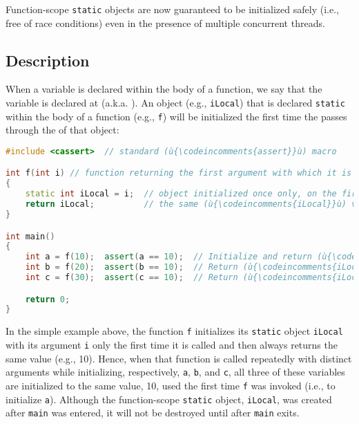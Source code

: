 

Function-scope \lstinline!static! objects are now guaranteed to be
initialized safely (i.e., free of race conditions) even in the presence
of multiple concurrent threads.

\subsection[Description]{Description}\label{description-functionstatic}

When a variable is declared within the body of a function, we say that
the variable is declared at  (a.k.a.
). An object (e.g., \lstinline!iLocal!) that is
declared \lstinline!static! within the body of a function (e.g.,
\lstinline!f!) will be initialized the first time the  passes through the  of that object:

\begin{lstlisting}[language=C++]
#include <cassert>  // standard (ù{\codeincomments{assert}}ù) macro

int f(int i) // function returning the first argument with which it is called
{
    static int iLocal = i;  // object initialized once only, on the first call
    return iLocal;          // the same (ù{\codeincomments{iLocal}}ù) value is returned on every call
}

int main()
{
    int a = f(10);  assert(a == 10);  // Initialize and return (ù{\codeincomments{iLocal}}ù).
    int b = f(20);  assert(b == 10);  // Return (ù{\codeincomments{iLocal}}ù).
    int c = f(30);  assert(c == 10);  // Return (ù{\codeincomments{iLocal}}ù).

    return 0;
}
\end{lstlisting}
    
\noindent In the simple example above, the function \lstinline!f! initializes its
\lstinline!static! object \lstinline!iLocal! with its argument \lstinline!i! only
the first time it is called and then always returns the same value
(e.g., 10). Hence, when that function is called repeatedly with distinct
arguments while initializing, respectively, \lstinline!a!, \lstinline!b!, and
\lstinline!c!, all three of these variables are initialized to the same
value, 10, used the first time \lstinline!f! was invoked (i.e., to
initialize \lstinline!a!). Although the function-scope \lstinline!static!
object, \lstinline!iLocal!, was created after \lstinline!main! was entered, it
will not be destroyed until after \lstinline!main! exits.

